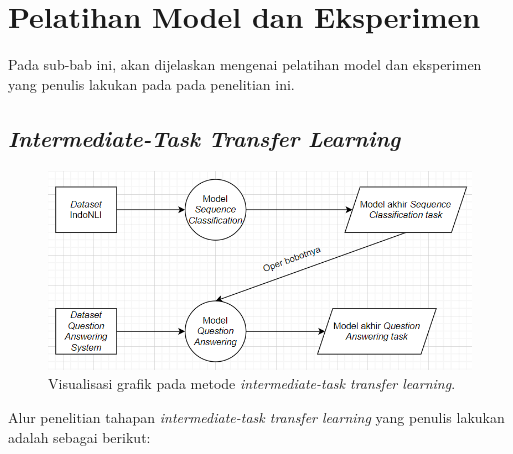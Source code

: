 \section{Pelatihan Model dan Eksperimen}
Pada sub-bab ini, akan dijelaskan mengenai pelatihan model dan eksperimen yang penulis lakukan pada pada penelitian ini. 

\subsection{\emph{Intermediate-Task Transfer Learning}}

\begin{figure}[h]
\includegraphics[width=\linewidth]{assets/pics/alur1.png}
\centering
\caption{Visualisasi grafik pada metode \emph{intermediate-task transfer learning}.}
\end{figure}

Alur penelitian tahapan \emph{intermediate-task transfer learning} yang penulis lakukan adalah sebagai berikut:

